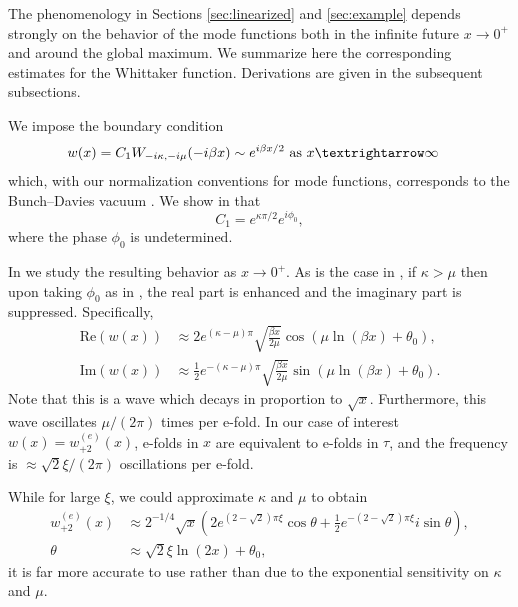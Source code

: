 The phenomenology in Sections \ref{sec:linearized} and \ref{sec:example} depends strongly on the behavior of the mode functions both in the infinite future $x\to0^{+}$ and around the global maximum. We summarize here the corresponding estimates for the Whittaker function. Derivations are given in the subsequent subsections.

We impose the boundary condition 
\begin{align}
w(x) & =C_{1}W_{-i\kappa,-i\mu}(-i\beta x)\sim e^{i\beta x/2}\textrm{ as }x\textrightarrow\infty\label{eq:whittaker-with-coeff}
\end{align}
 which, with our normalization conventions for mode functions, corresponds to the Bunch--Davies vacuum . We show in  that 
\[
C_{1}=e^{\kappa\pi/2}e^{i\phi_{0}},
\]
 where the phase $\phi_{0}$ is undetermined. 

In  we study the resulting behavior as $x\to0^{+}$. As is the case in , if $\kappa>\mu$ then upon taking $\phi_{0}$ as in , the real part is enhanced and the imaginary part is suppressed. Specifically, 
\begin{align}
\textrm{Re}(w(x)) & \approx2e^{(\kappa-\mu)\pi}\sqrt{\frac{\beta x}{2\mu}}\cos\left(\mu\ln(\beta x)+\theta_{0}\right),\label{eq:wh-re}\\
\textrm{Im}(w(x)) & \approx\tfrac{1}{2}e^{-(\kappa-\mu)\pi}\sqrt{\frac{\beta x}{2\mu}}\sin\left(\mu\ln(\beta x)+\theta_{0}\right).\label{eq:wh-im}
\end{align}
 Note that this is a wave which decays in proportion to $\sqrt{x}$. Furthermore, this wave oscillates $\mu/(2\pi)$ times per e-fold. In our case of interest $w(x)=w_{+2}^{(e)}(x)$, e-folds in $x$ are equivalent to e-folds in $\tau$, and the frequency is $\approx\sqrt{2}\xi/(2\pi)$ oscillations per e-fold. 

While for large $\xi$, we could approximate $\kappa$ and $\mu$ to obtain 
\begin{align}
w_{+2}^{(e)}(x) & \approx2^{-1/4}\sqrt{x}\left(2e^{(2-\sqrt{2})\pi\xi}\cos\theta+\tfrac{1}{2}e^{-(2-\sqrt{2})\pi\xi}i\sin\theta\right),\label{eq:as_wp2}\\
\theta & \approx\sqrt{2}\xi\ln(2x)+\theta_{0},\nonumber 
\end{align}
 it is far more accurate to use  rather than  due to the exponential sensitivity on $\kappa$ and $\mu$. 

